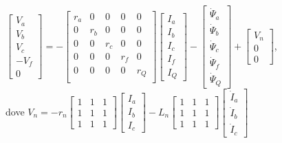 \documentclass[Lau,noexaminfo]{sapthesis}
\begin{document}
	$\begin{bmatrix}
		V_a\\
		V_b\\
		V_c\\
		-V_f\\
		0
	\end{bmatrix}=-
	\begin{bmatrix}
		r_a & 0 & 0 & 0 & 0\\
		0 & r_b & 0 & 0 & 0\\
		0 & 0 & r_c & 0 & 0\\
		0 & 0 & 0 & r_f & 0\\
		0 & 0 & 0 & 0 & r_Q\\
	\end{bmatrix}
	\begin{bmatrix}
		I_a\\
		I_b\\
		I_c\\
		I_f\\
		I_Q
	\end{bmatrix}-
	\begin{bmatrix}
		\dot{\Psi}_a\\
		\dot{\Psi}_b\\
		\dot{\Psi}_c\\
		\dot{\Psi}_f\\
		\dot{\Psi}_Q
	\end{bmatrix} +
	\begin{bmatrix}
		V_n\\
		0\\
		0
	\end{bmatrix}$,\\
	dove $V_n=-r_n
	\begin{bmatrix}
	 1 & 1 & 1\\
	 1 & 1 & 1\\
	 1 & 1 & 1
	\end{bmatrix}
	\begin{bmatrix}
	I_a\\
	I_b\\
	I_c
	\end{bmatrix}-
	L_n
	\begin{bmatrix}
	1 & 1 & 1\\
	1 & 1 & 1\\
	1 & 1 & 1
	\end{bmatrix}
	\begin{bmatrix}
	\dot{I}_a\\
	\dot{I}_b\\
	\dot{I}_c
	\end{bmatrix}$\\\\
\end{document}
